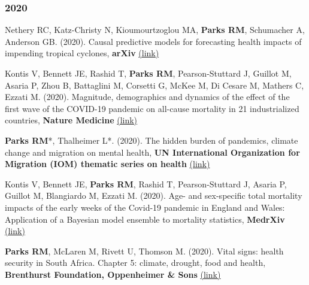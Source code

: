 \subsubsection*{2020}

\noindent Nethery RC, Katz-Christy N, Kioumourtzoglou MA, \textbf{Parks RM}, Schumacher A, Anderson GB. (2020). Causal predictive models for forecasting health impacts of impending tropical cyclones, \textbf{arXiv} \href{https://arxiv.org/abs/2010.11330}{(link)}

\vspace{2mm}

\noindent Kontis V, Bennett JE, Rashid T, \textbf{Parks RM}, Pearson-Stuttard J, Guillot M, Asaria P, Zhou B, Battaglini M, Corsetti G, McKee M, Di Cesare M, Mathers C, Ezzati M. (2020). Magnitude, demographics and dynamics of the effect of the first wave of the COVID-19 pandemic on all-cause mortality in 21 industrialized countries, \textbf{Nature Medicine} \href{https://doi.org/10.1038/s41591-020-1112-0}{(link)}

\vspace{2mm}

\noindent \textbf{Parks RM}*, Thalheimer L*. (2020). The hidden burden of pandemics, climate change and migration on mental health, \textbf{UN International Organization for Migration (IOM) thematic series on health} \href{https://environmentalmigration.iom.int/blogs/hidden-burden-pandemics-climate-change-and-migration-mental-health}{(link)}

\vspace{2mm}

\noindent Kontis V, Bennett JE, \textbf{Parks RM}, Rashid T, Pearson-Stuttard J, Asaria P, Guillot M, Blangiardo M, Ezzati M. (2020). Age- and sex-specific total mortality impacts of the early weeks of the Covid-19 pandemic in England and Wales: Application of a Bayesian model ensemble to mortality statistics, \textbf{MedrXiv} \href{https://www.medrxiv.org/content/10.1101/2020.05.20.20107680v1}{(link)}

\vspace{2mm}

\noindent \textbf{Parks RM}, McLaren M, Rivett U, Thomson M. (2020). Vital signs: health security in South Africa. Chapter 5: climate, drought, food and health, \textbf{Brenthurst Foundation, Oppenheimer \& Sons} \href{http://www.thebrenthurstfoundation.org/article/vital-signs-health-security-in-south-africa/}{(link)}

\vspace{2mm}

